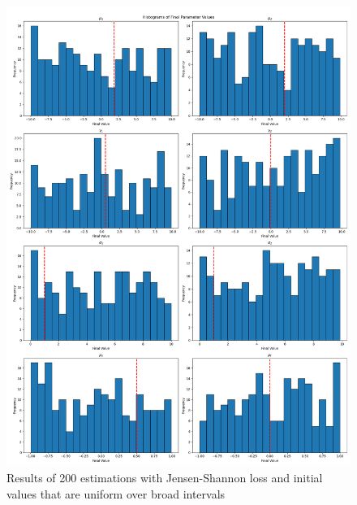 \begin{figure}
    \includegraphics[width=\textwidth]{./Images/js_wide_uniform_histograms.png}
    \caption{Results of 200 estimations with Jensen-Shannon loss and initial values that are uniform over broad intervals}
    \label{fig:js_wide_uniform_histograms}
\end{figure}

